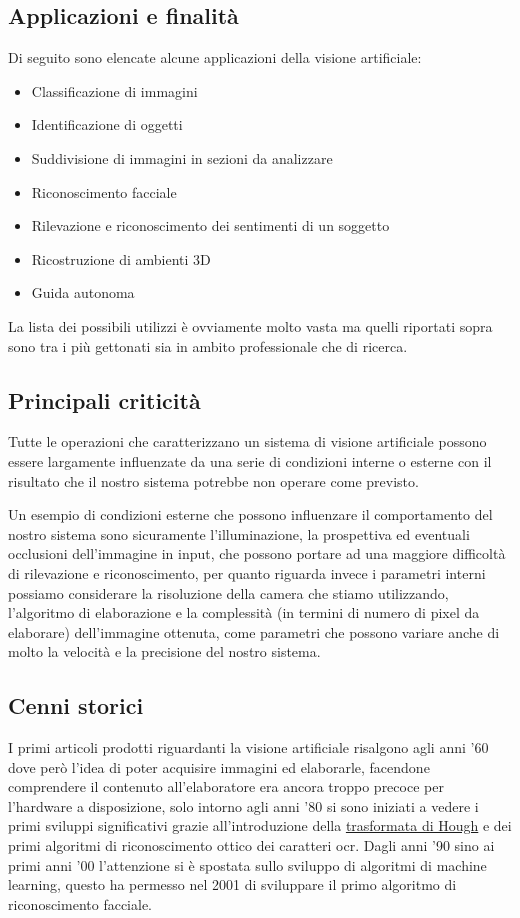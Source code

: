 \documentclass[12pt,a4paper,openright,twoside]{book}
\begin{document}
\subsection{Applicazioni e finalità}
Di seguito sono elencate alcune applicazioni della visione artificiale:
\begin{itemize}
	\item Classificazione di immagini
	\item Identificazione di oggetti
	\item Suddivisione di immagini in sezioni da analizzare
	\item Riconoscimento facciale
	\item Rilevazione e riconoscimento dei sentimenti di un soggetto
	\item Ricostruzione di ambienti 3D
	\item Guida autonoma
\end{itemize}
La lista dei possibili utilizzi è ovviamente molto vasta ma quelli riportati sopra sono tra i più gettonati sia in ambito professionale che di ricerca.

\subsection{Principali criticità}
Tutte le operazioni che caratterizzano un sistema di visione artificiale possono essere largamente influenzate da una serie di condizioni interne o esterne con il risultato che il nostro sistema potrebbe non operare come previsto.

Un esempio di condizioni esterne che possono influenzare il comportamento del nostro sistema sono sicuramente l'illuminazione, la prospettiva ed eventuali occlusioni dell'immagine in input, che possono portare ad una maggiore difficoltà di rilevazione e riconoscimento, per quanto riguarda invece i parametri interni possiamo considerare la risoluzione della camera che stiamo utilizzando, l'algoritmo di elaborazione e la complessità (in termini di numero di pixel da elaborare) dell'immagine ottenuta, come parametri che possono variare anche di molto la velocità e la precisione del nostro sistema.

\subsection{Cenni storici}
I primi articoli prodotti riguardanti la visione artificiale risalgono agli anni '60 dove però l'idea di poter acquisire immagini ed elaborarle, facendone comprendere il contenuto all'elaboratore era ancora troppo precoce per l'hardware a disposizione,
solo intorno agli anni '80 si sono iniziati a vedere i primi sviluppi significativi grazie all'introduzione della \href{https://en.wikipedia.org/wiki/Hough_transform}{trasformata di Hough}
e dei primi algoritmi di riconoscimento ottico dei caratteri \acrfull{ocr}.
Dagli anni '90 sino ai primi anni '00 l'attenzione si è spostata sullo sviluppo di algoritmi di machine learning, questo ha permesso nel 2001 di sviluppare il primo algoritmo di riconoscimento facciale.\cite{artificialVisionHistory}
\end{document}
